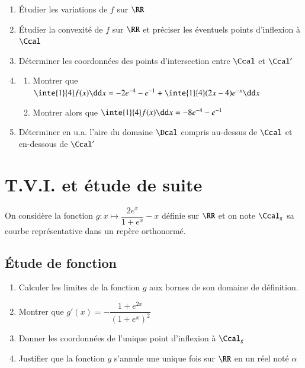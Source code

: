 \documentclass[oneside,12pt]{article}
\let\oldsection\section
\renewcommand{\section}{\newpage\oldsection}
\begin{document}
\begin{enumerate}
    \item Étudier les variations de $f$ sur $\RR$
    \item Étudier la convexité de $f$ sur $\RR$ et préciser les éventuels points d'inflexion à $\Ccal$
    \item Déterminer les coordonnées des points d'intersection entre $\Ccal$ et $\Ccal'$
    \item \begin{enumerate}
        \item Montrer que $\inte{1}{4}f(x)\dd x =-2e^{-4}-e^{-1}+\inte{1}{4}(2x-4)e^{-x}\dd x$
        \item Montrer alors que $\inte{1}{4}f(x)\dd x =-8e^{-4}-e^{-1}$
    \end{enumerate}
    \item Déterminer en u.a. l'aire du domaine $\Dcal$ compris au-dessus de $\Ccal$ et en-dessous de $\Ccal'$
\end{enumerate}



\section{T.V.I. et étude de suite}
On considère la fonction $g:x\mapsto\dfrac{2e^x}{1+e^x}-x$ définie sur $\RR$ et on note $\Ccal_g$ sa courbe représentative dans un repère orthonormé.

\subsection{Étude de fonction}
\begin{enumerate}
	\item Calculer les limites de la fonction $g$ aux bornes de son domaine de définition.
	\item Montrer que $g'(x)=-\dfrac{1+e^{2x}}{(1+e^x)^2}$
	\item Donner les coordonnées de l'unique point d'inflexion à $\Ccal_g$
	\item Justifier que la fonction $g$ s'annule une unique fois sur $\RR$ en un réel noté $\alpha$
\end{enumerate}
\end{document}
